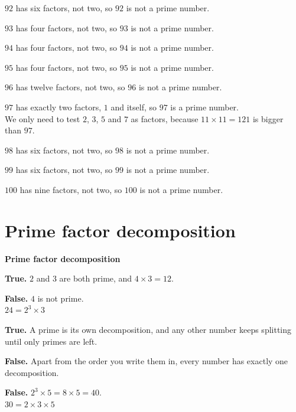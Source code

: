 \documentclass[aspectratio=169]{beamer}
\newcommand{\qtopic}[1]{%
  \section{#1}%
  \begin{frame}
    \vfill
    \begin{center}
      {\usebeamercolor[fg]{structure}\Huge\bfseries #1}
    \end{center}
    \vfill
  \end{frame}%
}
\begin{document}
  {$92$ has six factors, not two, so $92$ is not a prime number.}

  {$93$ has four factors, not two, so $93$ is not a prime number.}

  {$94$ has four factors, not two, so $94$ is not a prime number.}

  {$95$ has four factors, not two, so $95$ is not a prime number.}

  {$96$ has twelve factors, not two, so $96$ is not a prime number.}

  {$97$ has exactly two factors, $1$ and itself, so $97$ is a prime number.\\[0.45em]We only need to test $2$, $3$, $5$ and $7$ as factors, because $11\times 11=121$ is bigger than $97$.}

  {$98$ has six factors, not two, so $98$ is not a prime number.}

  {$99$ has six factors, not two, so $99$ is not a prime number.}

  {$100$ has nine factors, not two, so $100$ is not a prime number.}

\qtopic{Prime factor decomposition}

  {\textbf{True.} $2$ and $3$ are both prime,
   and $4\times 3=12$.}

  {\textbf{False.} $4$ is not prime.\\[0.3em]
   $24=2^3\times 3$}

  {\textbf{True.} A prime is its own decomposition, and any other number
   keeps splitting until only primes are left.}

  {\textbf{False.} Apart from the order you write them in,
   every number has exactly one decomposition.}

  {\textbf{False.} $2^3\times 5=8\times 5=40$.\\[0.3em]
   $30=2\times 3\times 5$}
\end{document}
